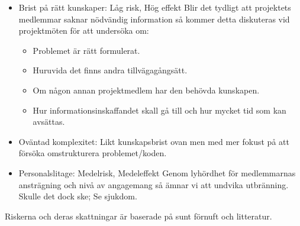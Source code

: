 \documentclass[paper=a4, fontsize=11pt,twoside]{article}
\begin{document}
\begin{itemize}
\item Brist på rätt kunskaper: Låg risk, Hög effekt
Blir det tydligt att projektets medlemmar saknar nödvändig information så kommer detta diskuteras vid projektmöten för att undersöka om: 
\begin{itemize}
\item Problemet är rätt formulerat.
\item Huruvida det finns andra tillvägagångsätt.
\item Om någon annan projektmedlem har den behövda kunskapen. 
\item Hur informationsinskaffandet skall gå till och hur mycket tid som kan avsättas.
\end{itemize}
\item Oväntad komplexitet:
Likt kunskapsbrist ovan men med mer fokust på att försöka omstrukturera problemet/koden.

\item Personalslitage: Medelrisk, Medeleffekt
Genom lyhördhet för medlemmarnas ansträgning och nivå av angagemang så ämnar vi att undvika utbränning. Skulle det dock ske; Se sjukdom.
\end{itemize}


Riskerna och deras skattningar är baserade på sunt förnuft och litteratur.
\end{document}
